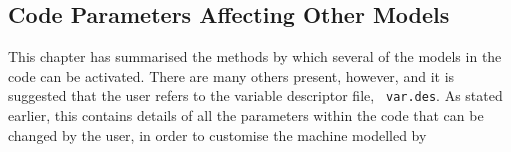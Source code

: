 
\subsection{Code Parameters Affecting Other Models}

This chapter has summarised the methods by which several of the models in the
code can be activated. There are many others present, however, and it is
suggested that the user refers to the variable descriptor file, {\tt
var.des}. As stated earlier, this contains details of all the parameters
within the code that can be changed by the user, in order to customise the
machine modelled by \PSD

\setlength{\parskip}{5mm}

